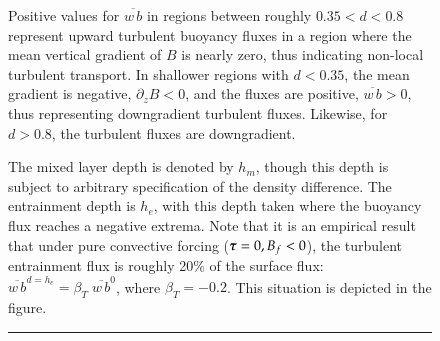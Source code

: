 \begin{figure}[h!t]
\begin{center}
{  \hspace{0.4cm}  Positive values for $\overline{w \, b}$  in regions between roughly $0.35 < d
  < 0.8$ represent upward turbulent buoyancy fluxes in a region where the mean vertical
  gradient of $B$ is nearly zero, thus indicating non-local turbulent transport.
  In shallower regions with $d < 0.35$, the mean gradient is negative,
  $\partial_{z} B < 0$, and the fluxes are positive, $\overline{w \,
    b} > 0$, thus representing downgradient turbulent fluxes.
  Likewise, for $d> 0.8$, the turbulent fluxes are downgradient.

  \hspace{0.4cm} The mixed layer depth is denoted by $h_{m}$, though
  this depth is subject to arbitrary specification of the density
  difference. The entrainment depth is $h_{e}$, with this depth taken
  where the buoyancy flux reaches a negative extrema. Note that it is
  an empirical result that under pure convective forcing ($\mbox{\boldmath $\tau$} =0,
  B_{f} < 0$), the turbulent entrainment flux is roughly 20\% of the
  surface flux: $\overline{w \, b}^{d=h_{e}} = \beta_{T} \;
  \overline{w \, b}^{0}$, where $\beta_{T} = -0.2$. This situation is
  depicted in the figure. }
\label{fig:kpp-figure1-reproduced}
\end{center}
\rule{\textwidth}{0.005in}
\end{figure}


